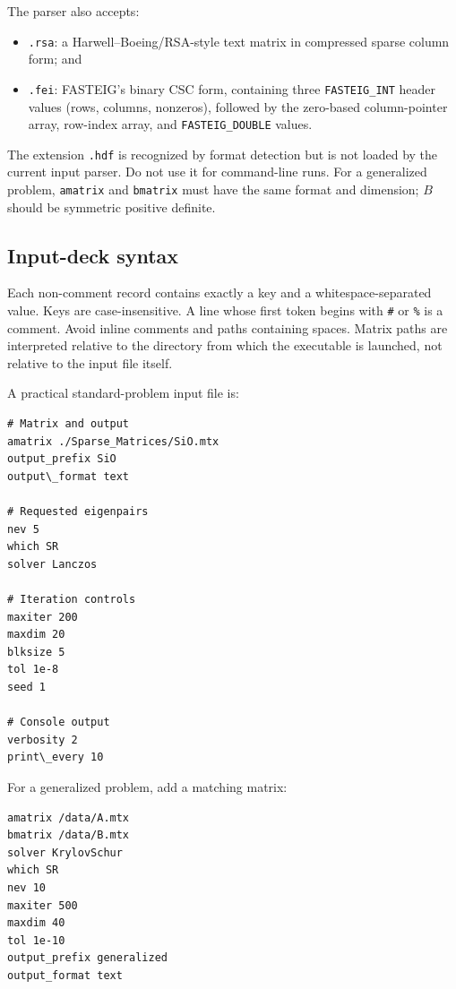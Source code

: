 \documentclass[11pt]{article}
\newcommand{\code}[1]{\texttt{#1}}
\begin{document}
The parser also accepts:
\begin{itemize}[leftmargin=*]
  \item \code{.rsa}: a Harwell--Boeing/RSA-style text matrix in compressed
        sparse column form; and
  \item \code{.fei}: FASTEIG's binary CSC form, containing three
        \code{FASTEIG\_INT} header values (rows, columns, nonzeros), followed by
        the zero-based column-pointer array, row-index array, and
        \code{FASTEIG\_DOUBLE} values.
\end{itemize}

The extension \code{.hdf} is recognized by format detection but is not loaded
by the current input parser.  Do not use it for command-line runs.  For a
generalized problem, \code{amatrix} and \code{bmatrix} must have the same
format and dimension; \(B\) should be symmetric positive definite.

\subsection{Input-deck syntax}

Each non-comment record contains exactly a key and a whitespace-separated
value.  Keys are case-insensitive.  A line whose first token begins with
\code{\#} or \code{\%} is a comment.  Avoid inline comments and paths containing
spaces.  Matrix paths are interpreted relative to the directory from which the
executable is launched, not relative to the input file itself.

A practical standard-problem input file is:

\begin{lstlisting}
# Matrix and output
amatrix ./Sparse_Matrices/SiO.mtx
output_prefix SiO
output\_format text

# Requested eigenpairs
nev 5
which SR
solver Lanczos

# Iteration controls
maxiter 200
maxdim 20
blksize 5
tol 1e-8
seed 1

# Console output
verbosity 2
print\_every 10
\end{lstlisting}

For a generalized problem, add a matching matrix:

\begin{lstlisting}
amatrix /data/A.mtx
bmatrix /data/B.mtx
solver KrylovSchur
which SR
nev 10
maxiter 500
maxdim 40
tol 1e-10
output_prefix generalized
output_format text
\end{lstlisting}
\end{document}
